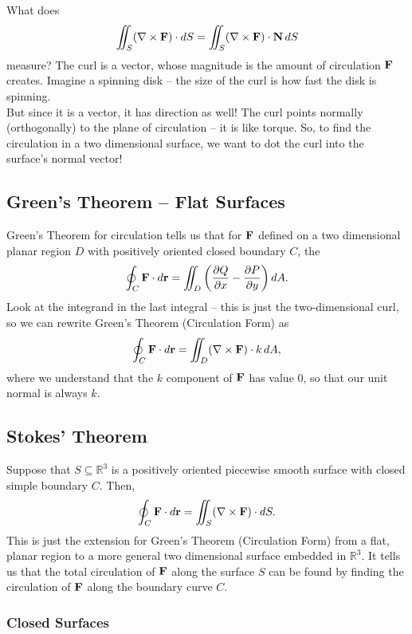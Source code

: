 What does 
\[
    \iint_S (\nabla \times \mathbf{F}) \cdot dS = \iint_S (\nabla \times \mathbf{F}) \cdot \mathbf{N} \, dS
\]
measure? The curl is a vector, whose magnitude is the amount of circulation \(\mathbf{F}\) creates. Imagine a spinning disk – the size of the curl is how fast the disk is spinning. \\

But since it is a vector, it has direction as well! The curl points normally (orthogonally) to the plane of circulation – it is like torque. So, to find the circulation in a two dimensional surface, we want to dot the curl into the surface’s normal vector! 

\subsection{Green's Theorem – Flat Surfaces}

Green’s Theorem for circulation tells us that for \(\mathbf{F}\) defined on a two dimensional planar region \(D\) with positively oriented closed boundary \(C\), the
\[
    \oint_C \mathbf{F} \cdot d\mathbf{r} = \iint_D \left( \frac{\partial Q}{\partial x} - \frac{\partial P}{\partial y} \right) dA.
\]
Look at the integrand in the last integral – this is just the two-dimensional curl, so we can rewrite Green’s Theorem (Circulation Form) as
\[
    \oint_C \mathbf{F} \cdot d\mathbf{r} = \iint_D (\nabla \times \mathbf{F}) \cdot k \, dA,
\]    
where we understand that the \(k\) component of \(\mathbf{F}\) has value 0, so that our unit normal is always \(k\). \\

\subsection{Stokes' Theorem}

Suppose that \(S \subseteq \mathbb{R}^3\) is a positively oriented piecewise smooth surface with closed simple boundary \(C\). Then,
\[
    \oint_C \mathbf{F} \cdot d\mathbf{r} = \iint_S (\nabla \times \mathbf{F}) \cdot dS.
\]
This is just the extension for Green’s Theorem (Circulation Form) from a flat, planar region to a more general two dimensional surface embedded in \(\mathbb{R}^3\). It tells us that the total circulation of \(\mathbf{F}\) along the surface \(S\) can be found by finding the circulation of \(\mathbf{F}\) along the boundary curve \(C\).

\subsubsection{Closed Surfaces}

